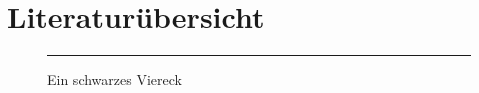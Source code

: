 \chapter{Literaturübersicht}

\begin{figure}[h]\centering
\rule{6cm}{4cm}
\caption{Ein schwarzes Viereck}
\end{figure}

\blindtext[10]

\blindtext[10]

\blindtext[10]

\blindtext[10]

\blindtext[10]



\blindtext[10]